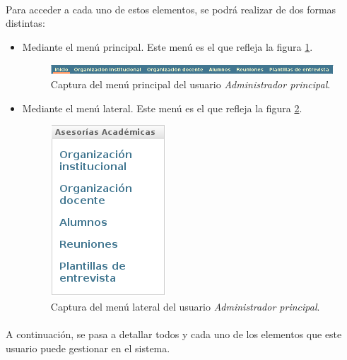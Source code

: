   \paragraph{}Para acceder a cada uno de estos elementos, se podrá realizar de
  dos formas distintas:

  \begin{itemize}
   \item Mediante el menú principal. Este menú es el que refleja la figura
   \ref{capturaMenuPrincipalAdminPrincipal}.

  \begin{figure}[!ht]
    \begin{center}
      \includegraphics[scale=0.55]{4.Funcionamiento_Aplicacion/4.3.Gestion/4.3.1.Administrador_Principal/4.3.1.1.Introduccion/menu_principal.png}
      \caption{Captura del menú principal del usuario \textit{Administrador principal}.}
      \label{capturaMenuPrincipalAdminPrincipal}
    \end{center}
  \end{figure}

   \item Mediante el menú lateral. Este menú es el que refleja la figura
   \ref{capturaMenuLateralAdminPrincipal}.

   \begin{figure}[!ht]
    \begin{center}
      \includegraphics[scale=0.55]{4.Funcionamiento_Aplicacion/4.3.Gestion/4.3.1.Administrador_Principal/4.3.1.1.Introduccion/menu_lateral.png}
      \caption{Captura del menú lateral del usuario \textit{Administrador principal}.}
      \label{capturaMenuLateralAdminPrincipal}
    \end{center}
  \end{figure}

  \end{itemize}

  \paragraph{}A continuación, se pasa a detallar todos y cada uno de los
  elementos que este usuario puede gestionar en el sistema.

